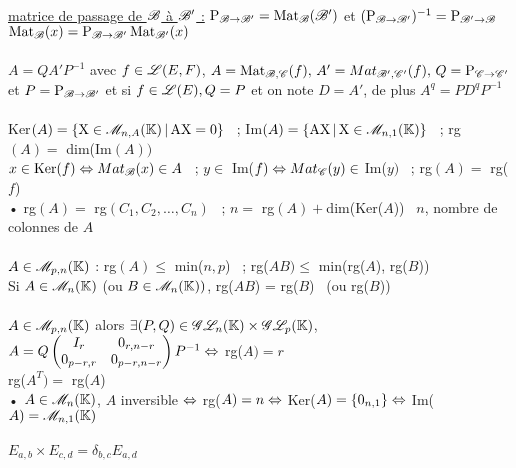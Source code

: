 \documentclass[12 pt]{book}
\begin{document}
\begin{flushleft}
\begin{doublespace}
	
	\text{ }\\
	\underline{matrice de passage de $\mathscr{B}$ à $\mathscr{B}'$ :} $\text{P}_{\mathscr{B} \rightarrow \mathscr{B}'} = \text{Mat}_{\mathscr{B}}(\mathscr{B}')$ et $(\text{P}_{\mathscr{B} \rightarrow \mathscr{B}'})^{- 1} = \text{P}_{\mathscr{B} ' \rightarrow \mathscr{B}}$\\ 
	$\text{Mat}_{\mathscr{B}}(x) =  \text{P}_{\mathscr{B} \rightarrow \mathscr{B}'} \, \text{Mat}_{\mathscr{B} '}(x)$\\

	\text{ }\\
	$ A = Q A' P^{- 1}$ avec $f\in\mathscr{L}(E,F)$, $A = \text{Mat}_{\mathscr{B},\mathscr{C}}(f), \, A' = Mat_{\mathscr{B}',\mathscr{C} '}(f), \, Q =  \text{P}_{\mathscr{C} \rightarrow \mathscr{C} '}$ et $ P =  \text{P}_{\mathscr{B} \rightarrow \mathscr{B}'}$ et si $f\in\mathscr{L}(E), Q = P$ et on note $D = A'$, de plus $A^q = PD^q P^{- 1}$\\

	\text{ }\\
	Ker$(A) = \{ \text{X}\in \mathscr{M}_{n,A}(\mathbb{K}) \, | \, \text{AX} = 0\}$ \ ; Im$(A) = \{ \text{AX} \, |\, \text{X}\in\mathscr{M}_{n,1}(\mathbb{K})\}$ \ ; rg$(A) =$ dim(Im$(A))$\\
	$x\in \text{Ker}(f) \Leftrightarrow Mat_{\mathscr{B}}(x)\in A$ \ ; $y\in $ Im($f) \Leftrightarrow Mat_{\mathscr{C}} (y)\in $ Im($y)$ \ ; rg$(A) =$ rg($f$)\\
	• rg$(A) =$ rg$(C_1,C_2, \dots,C_n)$ \ ; $n =$ rg$(A) + $dim(Ker($A$)) \ $n$, nombre de colonnes de $A$\\

	\text{ }\\
	$A\in\mathscr{M}_{p,n}(\mathbb{K})$ : rg$(A) \leq$ min($n,p$) \ ; rg($AB) \leq$ min(rg($A$), rg($B$))\\
	Si $A\in\mathscr{M}_n(\mathbb{K})$ (ou $B\in \mathscr{M}_n(\mathbb{K}))$, rg($AB$) = rg($B$) \ (ou rg($B$))\\
	
	\text{ }\\
	$A\in\mathscr{M}_{p,n}(\mathbb{K})$ alors $\exists (P,Q)\in \mathscr{G}\mathscr{L}_n(\mathbb{K})\times\mathscr{G}\mathscr{L}_p(\mathbb{K})$, $A = Q \begin{pmatrix} I_r & 0_{r, n-r} \\ 0_{p - r, r} & 0_{p - r, n - r}\end{pmatrix} P^{- 1} \Leftrightarrow$ rg($A) = r$\\
	rg($A^T) =$ rg($A$)\\
	• $A\in \mathscr{M}_n(\mathbb{K})$, $A$ inversible $\Leftrightarrow$ rg($A) = n \Leftrightarrow$ Ker($A) = \{ 0_{n,1} \} \Leftrightarrow$ Im($A) = \mathscr{M}_{n,1}(\mathbb{K})$\\
	\text{ }\\
	$E_{a,b} \times E_{c,d} = \delta_{b,c} E_{a,d}$\\

\end{doublespace}
\end{flushleft}
\newpage
\end{document}

